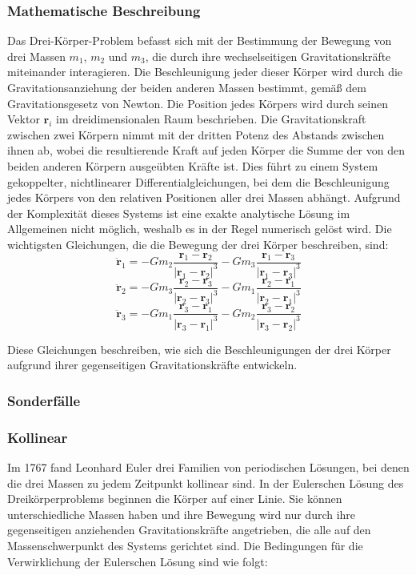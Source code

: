 \documentclass[a4paper,12pt,twoside]{article}
\begin{document}
\subsubsection{Mathematische Beschreibung}
Das Drei-Körper-Problem befasst sich mit der Bestimmung der Bewegung von drei Massen \( m_1 \), \( m_2 \) und \( m_3 \), die durch ihre wechselseitigen Gravitationskräfte miteinander interagieren. Die Beschleunigung jeder dieser Körper wird durch die Gravitationsanziehung der beiden anderen Massen bestimmt, gemäß dem Gravitationsgesetz von Newton. Die Position jedes Körpers wird durch seinen Vektor \( \mathbf{r}_i \) im dreidimensionalen Raum beschrieben. Die Gravitationskraft zwischen zwei Körpern nimmt mit der dritten Potenz des Abstands zwischen ihnen ab, wobei die resultierende Kraft auf jeden Körper die Summe der von den beiden anderen Körpern ausgeübten Kräfte ist. Dies führt zu einem System gekoppelter, nichtlinearer Differentialgleichungen, bei dem die Beschleunigung jedes Körpers von den relativen Positionen aller drei Massen abhängt. Aufgrund der Komplexität dieses Systems ist eine exakte analytische Lösung im Allgemeinen nicht möglich, weshalb es in der Regel numerisch gelöst wird.
Die wichtigsten Gleichungen, die die Bewegung der drei Körper beschreiben, sind:
\[
\ddot{\mathbf{r}}_1 = -G m_2 \frac{\mathbf{r}_1 - \mathbf{r}_2}{|\mathbf{r}_1 - \mathbf{r}_2|^3} - G m_3 \frac{\mathbf{r}_1 - \mathbf{r}_3}{|\mathbf{r}_1 - \mathbf{r}_3|^3}
\]
\[
\ddot{\mathbf{r}}_2 = -G m_3 \frac{\mathbf{r}_2 - \mathbf{r}_3}{|\mathbf{r}_2 - \mathbf{r}_3|^3} - G m_1 \frac{\mathbf{r}_2 - \mathbf{r}_1}{|\mathbf{r}_2 - \mathbf{r}_1|^3}
\]
\[
\ddot{\mathbf{r}}_3 = -G m_1 \frac{\mathbf{r}_3 - \mathbf{r}_1}{|\mathbf{r}_3 - \mathbf{r}_1|^3} - G m_2 \frac{\mathbf{r}_3 - \mathbf{r}_2}{|\mathbf{r}_3 - \mathbf{r}_2|^3}
\]

Diese Gleichungen beschreiben, wie sich die Beschleunigungen der drei Körper aufgrund ihrer gegenseitigen Gravitationskräfte entwickeln.

\subsubsection{Sonderfälle}

\subsubsection{Kollinear}
Im 1767 fand Leonhard Euler drei Familien von periodischen Lösungen, bei denen die drei Massen zu jedem Zeitpunkt kollinear sind. In der Eulerschen Lösung des Dreikörperproblems beginnen die Körper auf einer Linie. Sie können unterschiedliche Massen haben und ihre Bewegung wird nur durch ihre gegenseitigen anziehenden Gravitationskräfte angetrieben, die alle auf den Massenschwerpunkt des Systems gerichtet sind. Die Bedingungen für die Verwirklichung der Eulerschen Lösung sind wie folgt: 
\end{document}

